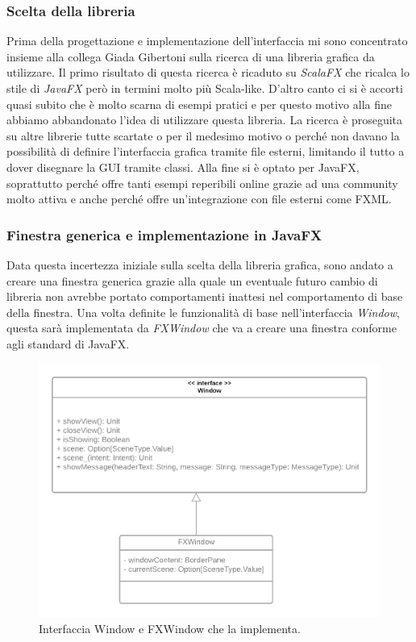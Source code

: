 \subsubsection{Scelta della libreria}

Prima della progettazione e implementazione dell'interfaccia mi sono concentrato insieme alla collega Giada Gibertoni sulla ricerca di una libreria grafica da utilizzare.
Il primo risultato di questa ricerca è ricaduto su \textit{ScalaFX} che ricalca lo stile di \textit{JavaFX} però in termini molto più Scala-like.
D'altro canto ci si è accorti quasi subito che è molto scarna di esempi pratici e per questo motivo alla fine abbiamo abbandonato l'idea di utilizzare questa libreria.
La ricerca è proseguita su altre librerie tutte scartate o per il medesimo motivo o perché non davano la possibilità di definire l'interfaccia grafica tramite file esterni, limitando il tutto a dover disegnare la GUI tramite classi.
Alla fine si è optato per JavaFX, soprattutto perché offre tanti esempi reperibili online grazie ad una community molto attiva e anche perché offre un'integrazione con file esterni come FXML.

\subsubsection{Finestra generica e implementazione in JavaFX}

Data questa incertezza iniziale sulla scelta della libreria grafica, sono andato a creare una finestra generica grazie alla quale un eventuale futuro cambio di libreria non avrebbe portato comportamenti inattesi nel comportamento di base della finestra.
Una volta definite le funzionalità di base nell'interfaccia \textit{Window}, questa sarà implementata da \textit{FXWindow} che va a creare una finestra conforme agli standard di JavaFX.

\begin{figure}[H]
  \includegraphics[width=15cm]{../res/6-implementazione/chiana/UML_Window.png}
  \caption{Interfaccia Window e FXWindow che la implementa.}
  \label{windowClass}
\end{figure}

